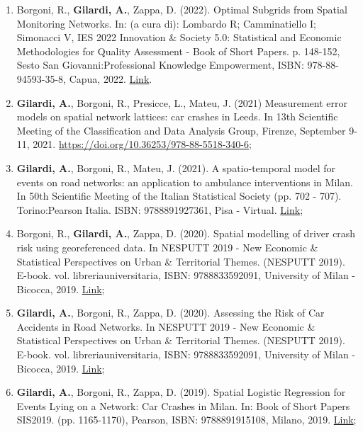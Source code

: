 \documentclass[11pt,a4paper,sans]{moderncv}
\begin{document}
\begin{enumerate}
  	\item Borgoni, R., \textbf{Gilardi, A.}, Zappa, D. (2022). Optimal Subgrids from Spatial Monitoring Networks. In: (a cura di): Lombardo R; Camminatiello I; Simonacci V, IES 2022 Innovation \& Society 5.0: Statistical and Economic Methodologies for Quality Assessment - Book of Short Papers. p. 148-152, Sesto San Giovanni:Professional Knowledge Empowerment, ISBN: 978-88-94593-35-8, Capua, 2022.  \href{https://drive.google.com/file/d/1HEZG50lecMyx_NDRLi2Y7d0papiX9ZWO/view}{Link}.
  	\item \textbf{Gilardi, A.}, Borgoni, R., Presicce, L., Mateu, J. (2021) Measurement error models on spatial network lattices: car crashes in Leeds. In 13th Scientific Meeting of the Classification and Data Analysis Group, Firenze, September 9-11, 2021. \url{https://doi.org/10.36253/978-88-5518-340-6};
  	\item \textbf{Gilardi, A.}, Borgoni, R., Mateu, J. (2021). A spatio-temporal model for events on road networks: an application to ambulance interventions in Milan. In 50th Scientific Meeting of the Italian Statistical Society (pp. 702 - 707). Torino:Pearson Italia. ISBN: 9788891927361, Pisa - Virtual. \href{https://it.pearson.com/content/dam/region-core/italy/pearson-italy/pdf/Docenti/Universit%C3%A0/pearson-sis-book-2021-parte-1.pdf}{Link}; 
  	\item Borgoni, R., \textbf{Gilardi, A.}, Zappa, D. (2020). Spatial modelling of driver crash risk using georeferenced data. In NESPUTT 2019 - New Economic \& Statistical Perspectives on Urban \& Territorial Themes. (NESPUTT 2019). E-book. vol. libreriauniversitaria, ISBN: 9788833592091, University of Milan - Bicocca, 2019. \href{https://www.libreriauniversitaria.it/ebook/9788833592091/autore-riccardo-borgoni/new-economic-statistical-perspectives-on-urban-and-territorial-themes-nesputt-2019-e-book.htm}{Link};
  	\item \textbf{Gilardi, A.}, Borgoni, R., Zappa, D. (2020). Assessing the Risk of Car Accidents in Road Networks. In NESPUTT 2019 - New Economic \& Statistical Perspectives on Urban \& Territorial Themes. (NESPUTT 2019). E-book. vol. libreriauniversitaria, ISBN: 9788833592091, University of Milan - Bicocca, 2019.  \href{https://www.libreriauniversitaria.it/ebook/9788833592091/autore-riccardo-borgoni/new-economic-statistical-perspectives-on-urban-and-territorial-themes-nesputt-2019-e-book.htm}{Link};
  	\item \textbf{Gilardi, A.}, Borgoni, R., Zappa, D. (2019). Spatial Logistic Regression for Events Lying on a Network: Car Crashes in Milan. In: Book of Short Papers SIS2019. (pp. 1165-1170), Pearson, ISBN: 9788891915108, Milano, 2019.   \href{https://it.pearson.com/content/dam/region-core/italy/pearson-italy/pdf/Dirigenti%20e%20istituzioni/ISTITUZIONI-HE-PDF-sis2019_V4.pdf}{Link};

\end{enumerate}
\end{document}
